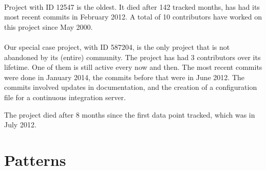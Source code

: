 \paragraph{}
Project with ID 12547 is the oldest. It died after 142 tracked months, has had
its most recent commits in February 2012. A total of 10 contributors have
worked on this project since May 2000.

\paragraph{}
Our special case project, with ID 587204, is the only project that is not
abandoned by its (entire) community. The project has had 3 contributors over its
lifetime. One of them is still active every now and then. The most recent
commits were done in January 2014, the commits before that were in June 2012.
The commits involved updates in documentation, and the creation of a
configuration file for a continuous integration server.

The project died after 8 months since the first data point tracked, which was in
July 2012.

\section{Patterns}


\begin{comment}
- Factual results
- Tables and figures for clarification

This chapter presents and clarifies the results obtained during the research.
The focus should be on the factual results, not the interpretation or
discussion. Tables and graphics should be used to increase the clarity of the
results where applicable.
Have a look at the the results chapter in this example thesis on Paul’s
homepage\footnote{http://homepages.cwi.nl/~paulk/thesesMasterSoftwareEngineering/2006/ArnoldLankamp.pdf}.
\end{comment}
